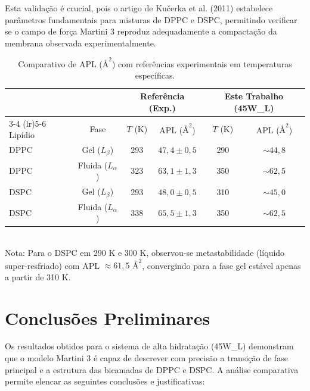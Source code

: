 \documentclass[12pt]{article} %
\begin{document}
Esta validação é crucial, pois o artigo de Kučerka et al. (2011) estabelece parâmetros fundamentais para misturas de DPPC e DSPC, permitindo verificar se o campo de força Martini 3 \cite{pedersen2024} reproduz adequadamente a compactação da membrana observada experimentalmente.

\begin{table}[htbp]
    \centering
    \caption{Comparativo de APL ($\text{\AA}^2$) com referências experimentais em temperaturas específicas.}
    \label{tab:comparativo}
    \begin{tabular}{@{}lccccc@{}}
        \toprule
        & & \multicolumn{2}{c}{Referência (Exp.)} & \multicolumn{2}{c}{Este Trabalho (45W\_L)} \\ 
        \cmidrule(lr){3-4} \cmidrule(lr){5-6}
        Lipídio & Fase & $T$ (K) & APL ($\text{\AA}^2$) & $T$ (K) & APL ($\text{\AA}^2$) \\ \midrule
        DPPC    & Gel ($L_\beta$)     & 293 & $47,4 \pm 0,5$ & 290 & $\sim 44,8$ \\
        DPPC    & Fluida ($L_\alpha$) & 323 & $63,1 \pm 1,3$ & 350 & $\sim 62,5$ \\
        DSPC    & Gel ($L_\beta$)     & 293 & $48,0 \pm 0,5$ & 310 & $\sim 45,0$ \\
        DSPC    & Fluida ($L_\alpha$) & 338 & $65,5 \pm 1,3$ & 350 & $\sim 62,5$ \\ \bottomrule
    \end{tabular}
    \small \\ Nota: Para o DSPC em 290 K e 300 K, observou-se metastabilidade (líquido super-resfriado) com APL $\approx 61,5 \text{ \AA}^2$, convergindo para a fase gel estável apenas a partir de 310 K.
\end{table}

\section{Conclusões Preliminares}

Os resultados obtidos para o sistema de alta hidratação (45W\_L) demonstram que o modelo Martini 3 é capaz de descrever com precisão a transição de fase principal e a estrutura das bicamadas de DPPC e DSPC. A análise comparativa permite elencar as seguintes conclusões e justificativas:
\end{document}
